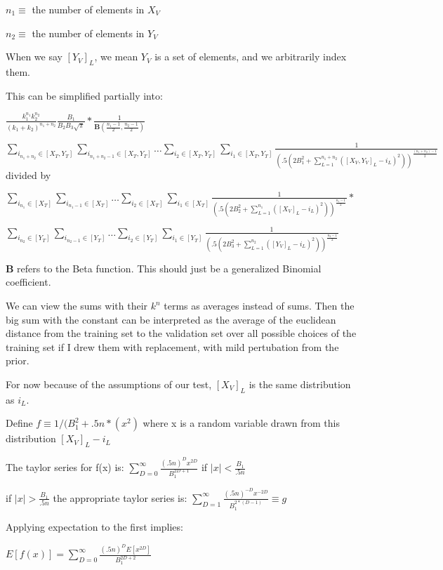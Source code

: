 \documentclass[11pt]{article}
\begin{document}
$n_1 \equiv $ the number of elements in $X_V$

$n_2 \equiv $ the number of elements in $Y_V$


When we say $[Y_V]_{L}$, we mean $Y_V$ is a set of elements, and we arbitrarily index them.

This can be simplified partially into:

$\frac{k_1^{n_1}k_2^{n_2}}{(k_1 + k_2)^{n_1+n_2}} \frac{B_1}{B_2 B_3 \sqrt{\pi}} * \frac{1}{ \mathbf{B}(\frac{n_1 -1}{2}, \frac{n_2 -1}{2})} $ 

$ \sum_{i_{n_1+n_2} \in [X_T, Y_T]} \sum_{i_{n_1+n_2-1}\in [X_T, Y_T]} \ldots  \sum_{i_{2}\in [X_T, Y_T]} \sum_{i_{1}\in [X_T, Y_T]} \frac{1}{(.5(2B_1^2 +  \sum_{L=1}^{n_1+n_2} ([X_V, Y_V]_{L} - i_L)^2))^{\frac{(n_1+n_2)-1}{2}}} $ divided by 

$ \sum_{i_{n_1} \in [X_T]} \sum_{i_{n_1-1}\in [X_T]} \ldots  \sum_{i_{2}\in [X_T]} \sum_{i_{1}\in [X_T]} \frac{1}{(.5(2B_2^2 +  \sum_{L=1}^{{n_1}} ([X_V]_{L} - i_L)^2))^{\frac{{n_1}-1}{2}}}  * $

$ \sum_{i_{n_2} \in [Y_T]} \sum_{i_{n_2-1}\in [Y_T]} \ldots  \sum_{i_{2}\in [Y_T]} \sum_{i_{1}\in [Y_T]} \frac{1}{(.5(2B_3^2 +  \sum_{L=1}^{n_2} ([Y_V]_{L} - i_L)^2))^{\frac{n_2-1}{2}}} $

$\mathbf{B}$ refers to the Beta function. This should just be a generalized Binomial coefficient.

We can view the sums with their $k^n$ terms as averages instead of sums. Then the big sum with the constant can be interpreted as the average of the euclidean distance from the training set to the validation set over all possible choices of the training set if I drew them with replacement, with mild pertubation from the prior.

For now because of the assumptions of our test, $[X_V]_{L}$ is the same distribution as $i_L$.

Define $f \equiv 1 / (B_1^2 + .5n*(x^2)$ where x is a random variable drawn from this distribution $[X_V]_{L} - i_L$

The taylor series for f(x) is: $\sum_{D=0}^\infty \frac{(.5n)^{D}x^{2D}}{B_1^{2D+1}}$ if $|x| < \frac{B_1}{.5n} $

if $|x| > \frac{B_1}{.5n}$ the appropriate taylor series is: $\sum_{D=1}^\infty \frac{(.5n)^{-D}x^{-2D}}{B_1^{2*(D-1)}} \equiv g$ 

Applying expectation to the first implies: 

$E[f(x)] = \sum_{D=0}^\infty \frac{(.5n)^D E[x^{2D}]}{B_1^{2D+2}}$
\end{document}
